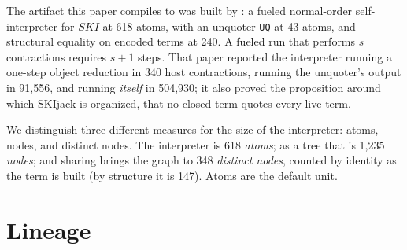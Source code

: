 \documentclass[english,submission,code=tt]{programming}
\begin{document}
The artifact this paper compiles to was built by \citet{Davis2027}: a
fueled normal-order self-interpreter for $SKI$ at 618 atoms, with an
unquoter \texttt{UQ} at 43 atoms, and structural equality on encoded
terms at 240.  A fueled run that performs $s$ contractions requires
$s+1$ steps.
That paper reported the interpreter running a one-step object reduction
in 340 host contractions, running the unquoter's output in 91,556, and
running \emph{itself} in 504,930; it also proved the proposition around
which SKIjack is organized, that no closed term quotes every live term.

We distinguish three different measures for the size of the 
interpreter: atoms, nodes, and distinct nodes.  The interpreter is 618 
\emph{atoms}; as a tree that is 1{,}235 \emph{nodes}; and sharing 
brings the graph to 348 \emph{distinct nodes}, counted by identity as 
the term is built (by structure it is 147).  Atoms are the default unit.

\section{Lineage}\label{sec:lineage}
\end{document}
